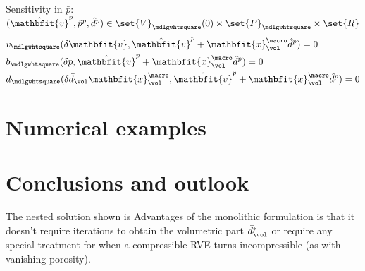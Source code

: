 \documentclass[a4paper,11pt]{article}
\renewcommand{\ta}[1]{\mathbfit{#1}}
\renewcommand{\ts}[1]{\mathbfit{#1}}
\renewcommand{\Box}{\mdlgwhtsquare}
\begin{document}
Sensitivity in $\bar p$: $(\hat{\ta v}^{p}, \hat{p}^{p}, \hat{d}^{p}) \in \set{V}_\Box(0)\times \set{P}_\Box \times\set{R}$
\begin{align}
 &v_\Box(\delta\ta v, \hat{\ta v}^{p}+\ta x^\macro_\vol \hat{d}^{p}) = 0
 \\
 &b_\Box(\delta p,\hat{\ta v}^{p} + \ta x^\macro_\vol \hat{d}^{p}) = 0
 \\
 &d_\Box(\delta\bar{d}_\vol \ta x^\macro_\vol, \hat{\ta v}^{p}+\ta x^\macro_\vol \hat{d}^{p}) = 0
\end{align}



\section{Numerical examples} \label{sec:numerical_examples}

\section{Conclusions and outlook} \label{sec:conclusions}
The nested solution shown is 
Advantages of the monolithic formulation is that it doesn't require iterations to obtain the volumetric part $\bar{d}_\vol^*$ or require any special treatment 
for when a compressible RVE turns incompressible (as with vanishing porosity).
\end{document}
